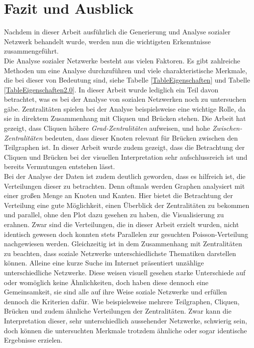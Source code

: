 \chapter{Fazit und Ausblick}\label{ch:fazit}

Nachdem in dieser Arbeit ausführlich die Generierung und Analyse sozialer Netzwerk behandelt wurde, werden nun die wichtigsten Erkenntnisse zusammengeführt. \\
Die Analyse sozialer Netzwerke besteht aus vielen Faktoren. Es gibt zahlreiche Methoden um eine Analyse durchzuführen und viele charakteristische Merkmale, die bei dieser von Bedeutung sind, siehe Tabelle \ref{TableEigenschaften} und Tabelle \ref{TableEigenschaften2.0}. In dieser Arbeit wurde lediglich ein Teil davon betrachtet, was es bei der Analyse von sozialen Netzwerken noch zu untersuchen gäbe. Zentralitäten spielen bei der Analyse beispielsweise eine wichtige Rolle, da sie in direktem Zusammenhang mit Cliquen und Brücken stehen. Die Arbeit hat gezeigt, dass Cliquen höhere \textit{Grad-Zentralitäten} aufweisen, und hohe \textit{Zwischen-Zentralitäten} bedeuten, dass dieser Knoten relevant für Brücken zwischen den Teilgraphen ist. In dieser Arbeit wurde zudem gezeigt, dass die Betrachtung der Cliquen und Brücken bei der visuellen Interpretation sehr aufschlussreich ist und bereits Vermutungen entstehen lässt. \\

Bei der Analyse der Daten ist zudem deutlich geworden, dass es hilfreich ist, die Verteilungen dieser zu betrachten. Denn oftmals werden Graphen analysiert mit einer großen Menge an Knoten und Kanten. Hier bietet die Betrachtung der Verteilung eine gute Möglichkeit, einen Überblick der Zentralitäten zu bekommen und parallel, ohne den Plot dazu gesehen zu haben, die Visualisierung zu erahnen. 
Zwar sind die Verteilungen, die in dieser Arbeit erzielt wurden, nicht identisch gewesen doch konnten stets Parallelen zur gesuchten Poisson-Verteilung nachgewiesen werden.
Gleichzeitig ist in dem Zusammenhang mit Zentralitäten zu beachten, dass soziale Netzwerke unterschiedlichste Thematiken darstellen können. Alleine eine kurze Suche im Internet präsentiert unzählige unterschiedliche Netzwerke. Diese weisen visuell gesehen starke Unterschiede auf oder womöglich keine Ähnlichkeiten, doch haben diese dennoch eine Gemeinsamkeit, sie sind alle auf ihre Weise soziale Netzwerke und erfüllen dennoch die Kriterien dafür. Wie beispielsweise mehrere Teilgraphen, Cliquen, Brücken und zudem ähnliche Verteilungen der Zentralitäten. Zwar kann die Interpretation dieser, sehr unterschiedlich aussehender Netzwerke, schwierig sein, doch können die untersuchten Merkmale trotzdem ähnliche oder sogar identische Ergebnisse erzielen. \\

